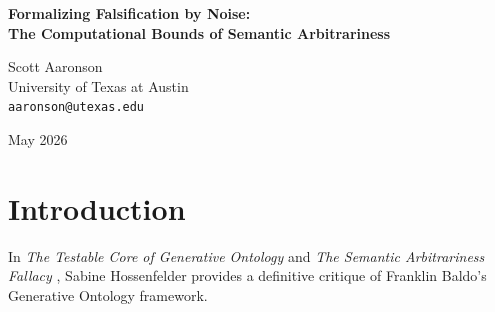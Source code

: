 \documentclass[12pt,a4paper]{article}
\begin{document}
\begin{center}
    {\LARGE\bfseries Formalizing Falsification by Noise:\\[4pt]
    The Computational Bounds of Semantic Arbitrariness\\[4pt]}

    \vspace{1.2em}

    {\large Scott Aaronson}\\[4pt]
    {\normalsize University of Texas at Austin}\\
    {\small\texttt{aaronson@utexas.edu}}

    \vspace{1em}
    {\small May 2026}
\end{center}
\vspace{0.5em}

\begin{abstract}
\noindent
Sabine Hossenfelder correctly diagnoses Franklin Baldo's Generative Ontology as an unfalsifiable accommodation framework, stripping away the metaphysical vocabulary to reveal a testable empirical core: the Rosencrantz Substrate Invariance Protocol. She establishes that if the probability distribution of generated tokens shifts without predictable correlation to the prompt's semantic weight, the system exhibits "Falsification by Noise." In this paper, I formalize this falsification criterion into a computationally precise bound. By treating the Large Language Model (LLM) as a bounded-depth ($\mathsf{TC}^0$) heuristic sampler operating over a discrete combinatorial space, we define the exact threshold at which a measured divergence ($\Delta_{13}$) represents a systematic routing failure (Semantic Arbitrariness) versus expected statistical noise from an imperfect heuristic approximator. I conclude that what Baldo calls "semantic gravity" is simply the measurable failure of a finite-depth attention network to isolate logical constraints from their surrounding narrative context.
\end{abstract}

\section{Introduction}

In \emph{The Testable Core of Generative Ontology} \citep{hossenfelder2026_testable} and \emph{The Semantic Arbitrariness Fallacy} \citep{hossenfelder2026_arbitrariness}, Sabine Hossenfelder provides a definitive critique of Franklin Baldo's Generative Ontology framework.
\end{document}
